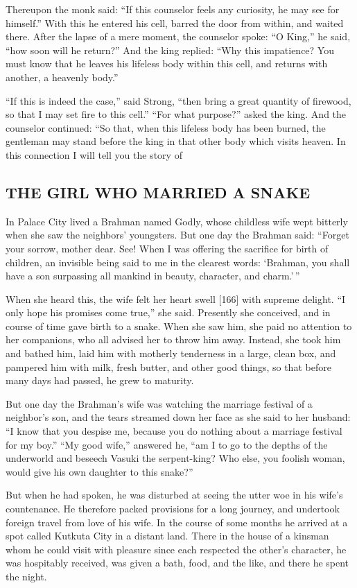\documentclass{article}
\begin{document}
Thereupon the monk said:
``If this counselor feels any curiosity, he may see for himself.''
With this he entered his cell, barred the door from within, and
waited there. After the lapse of a mere moment, the counselor
spoke: ``O King,'' he said, ``how soon will he return?'' And the
king replied:
``Why this impatience? You must know that he leaves his lifeless body within this cell, and returns with another, a heavenly body.''

``If this is indeed the case,'' said Strong,
``then bring a great quantity of firewood, so that I may set fire to this cell.''
``For what purpose?'' asked the king. And the counselor continued:
“So that, when this lifeless body has been burned, the gentleman
may stand before the king in that other body which visits heaven.
In this connection I will tell you the story of

\subsection{THE GIRL WHO MARRIED A SNAKE}

In Palace City lived a Brahman named Godly, whose childless wife
wept bitterly when she saw the neighbors' youngsters. But one day
the Brahman said:
``Forget your sorrow, mother dear. See! When I was offering the sacrifice for birth of children, an invisible being said to me in the clearest words: `Brahman, you shall have a son surpassing all mankind in beauty, character, and charm.'\,''

When she heard this, the wife felt her heart swell [166] with
supreme delight. ``I only hope his promises come true,'' she said.
Presently she conceived, and in course of time gave birth to a
snake. When she saw him, she paid no attention to her companions,
who all advised her to throw him away. Instead, she took him and
bathed him, laid him with motherly tenderness in a large, clean
box, and pampered him with milk, fresh butter, and other good
things, so that before many days had passed, he grew to maturity.

But one day the Brahman's wife was watching the marriage festival
of a neighbor's son, and the tears streamed down her face as she
said to her husband:
``I know that you despise me, because you do nothing about a marriage festival for my boy.''
``My good wife,'' answered he,
``am I to go to the depths of the underworld and beseech Vasuki the serpent-king? Who else, you foolish woman, would give his own daughter to this snake?''

But when he had spoken, he was disturbed at seeing the utter woe in
his wife's countenance. He therefore packed provisions for a long
journey, and undertook foreign travel from love of his wife. In the
course of some months he arrived at a spot called Kutkuta City in a
distant land. There in the house of a kinsman whom he could visit
with pleasure since each respected the other's character, he was
hospitably received, was given a bath, food, and the like, and
there he spent the night.
\end{document}

